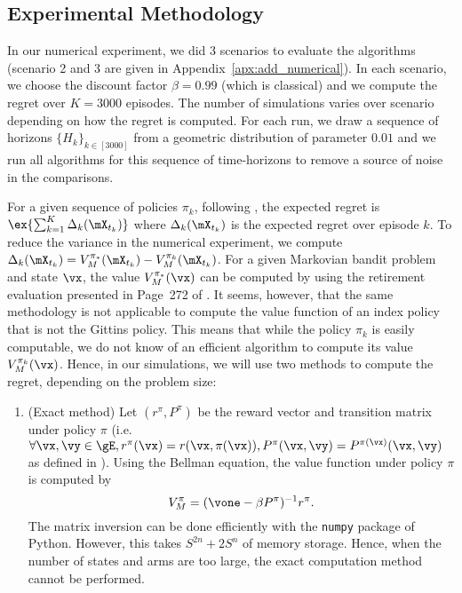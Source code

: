 \begin{subappendices}
\subsection{Experimental Methodology}
\label{ssec:experimental_methodo}

In our numerical experiment, we did 3 scenarios to evaluate the algorithms (scenario 2 and 3 are given in Appendix~\ref{apx:add_numerical}). In each scenario, we choose the discount factor $\beta=0.99$ (which is classical) and we compute the regret over $K=3000$ episodes. The number of simulations varies over scenario depending on how the regret is computed. For each run, we draw a sequence of horizons $\{H_k\}_{k\in[3000]}$ from a geometric distribution of parameter $0.01$ and we run all algorithms for this sequence of time-horizons to remove a source of noise in the comparisons.  

For a given sequence of policies $\pi_k$, following , the expected regret is $\ex{\sum_{k=1}^K\Delta_k(\mX_{t_k})}$ where $\Delta_k(\mX_{t_k})$ is the expected regret over episode $k$.
To reduce the variance in the numerical experiment, we compute
$\Delta_k(\mX_{t_k})=V^{\pi_*}_M(\mX_{t_k}) -V^{\pi_k}_M(\mX_{t_k})$.
For a given Markovian bandit problem and state $\vx$, the value $V^{\pi_*}_{M}(\vx)$ can be computed by using the retirement evaluation presented in Page~272 of \cite{whittle1996optimal}. It seems, however, that the same methodology is not applicable to compute the value function of an index policy that is not the Gittins policy. This means that while the policy $\pi_k$ is easily computable, we do not know of an efficient algorithm to compute its value $V^{\pi_k}_{M}(\vx)$. Hence, in our simulations, we will use two methods to compute the regret, depending on the problem size:
\begin{enumerate}
    \item (Exact method) Let $(r^{\pi}, P^{\pi})$ be the reward vector and transition matrix under policy $\pi$ (i.e. $\forall \vx, \vy\in\gE, r^{\pi}(\vx)=r(\vx,\pi(\vx)), P^{\pi}(\vx,\vy)=P^{\pi(\vx)}(\vx, \vy)$ as defined in ). Using the Bellman equation, the value function under policy $\pi$ is computed by
    \begin{equation}
        \label{eq:exact_value}
        V_{M}^{\pi}=(\vone-\beta P^{\pi})^{-1}r^{\pi}.
    \end{equation}
    The matrix inversion can be done efficiently with the \texttt{numpy} package of Python. However, this takes $S^{2n}+2S^{n}$ of memory storage. Hence, when the number of states and arms are too large, the exact computation method cannot be performed. 


\end{enumerate}
\end{subappendices}

